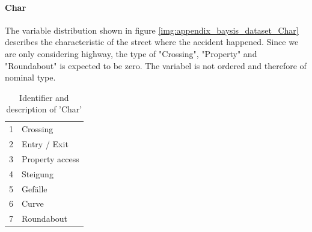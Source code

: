 \documentclass[a4paper,headsepline,footsepline,fontsize=11pt,BCOR=12mm,DIV=12]{report}
\begin{document}
\paragraph{Char}
The variable distribution shown in figure \ref{img:appendix_baysis_dataset_Char} describes the characteristic of the street where the accident happened. Since we are only considering highway, the type of "Crossing", "Property" and "Roundabout" is expected to be zero. The variabel is not ordered and therefore of nominal type.
\noindent
\begin{table}[h!]
	\centering
	\begin{tabular}{c|l}  
		1 & Crossing \\
	    2 & Entry / Exit \\
	    3 & Property access \\
	    4 & Steigung \\ %
	    5 & Gefälle \\ %
	    6 & Curve \\
	    7 & Roundabout \\
	\end{tabular}
	\caption{Identifier and description of 'Char'}
	\label{table:baysis_dataset_Char}
\end{table}
\end{document}
